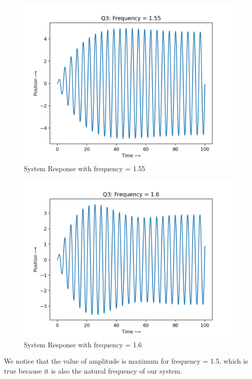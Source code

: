 \documentclass[11pt, a4paper]{article}
\begin{document}
\begin{figure}[tbh!]
\centering
\includegraphics[scale=0.6]{Q3_4.png}
\caption{System Response with frequency = 1.55}
\label{fig:System Response with frequency = 1.55}
\end{figure}
\clearpage

\begin{figure}[tbh!]
\centering
\includegraphics[scale=0.6]{Q3_5.png}
\caption{System Response with frequency = 1.6}
\label{fig:System Response with frequency = 1.6}
\end{figure}
We notice that the value of amplitude is maximum for frequency = 1.5, which is true because it is also the natural frequency of our system.
\end{document}
